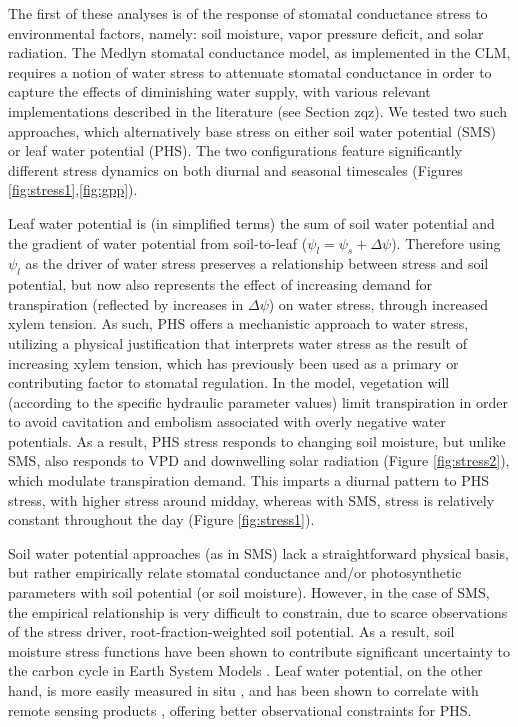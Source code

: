 \documentclass[draft,linenumbers]{agujournal}
\begin{document}
    The first of these analyses is of the response of stomatal conductance stress to environmental factors, namely: soil moisture, vapor pressure deficit, and solar radiation.
    The Medlyn stomatal conductance model, as implemented in the CLM, requires a notion of water stress to attenuate stomatal conductance in order to capture the effects of diminishing water supply,
    with various relevant implementations described in the literature (see Section zqz).
    We tested two such approaches, which alternatively base stress on either soil water potential (SMS) or leaf water potential (PHS).
    The two configurations feature significantly different stress dynamics on both diurnal and seasonal timescales (Figures \ref{fig:stress1},\ref{fig:gpp}).     
        
    Leaf water potential is (in simplified terms) the sum of soil water potential and the gradient of water potential from soil-to-leaf ($\psi_l=\psi_s+\Delta\psi$).
    Therefore using $\psi_l$ as the driver of water stress preserves a relationship between stress and soil potential, but now also represents the effect of increasing demand for transpiration (reflected by increases in $\Delta\psi$) on water stress, through increased xylem tension.
    As such, PHS offers a mechanistic approach to water stress, utilizing a physical justification that interprets water stress as the result of increasing xylem tension, which has previously been used as a primary \citep{sperry2017} or contributing \citep{novick2016a} factor to stomatal regulation.
    In the model, vegetation will (according to the specific hydraulic parameter values) limit transpiration in order to avoid cavitation and embolism associated with overly negative water potentials.
    As a result, PHS stress responds to changing soil moisture, but unlike SMS, also responds to VPD and downwelling solar radiation (Figure \ref{fig:stress2}), which modulate transpiration demand.
    This imparts a diurnal pattern to PHS stress, with higher stress around midday, whereas with SMS, stress is relatively constant throughout the day (Figure \ref{fig:stress1}).
   
    Soil water potential approaches (as in SMS) lack a straightforward physical basis, but rather empirically relate stomatal conductance and/or photosynthetic parameters with soil potential (or soil moisture).
    However, in the case of SMS, the empirical relationship is very difficult to constrain, due to scarce observations of the stress driver, root-fraction-weighted soil potential.
    As a result, soil moisture stress functions have been shown to contribute significant uncertainty to the carbon cycle in Earth System Models \citep{trugman2018}.
    Leaf water potential, on the other hand, is more easily measured in situ \citep{boyer1967}, and has been shown to correlate with remote sensing products \citep{momen2017}, offering better observational constraints for PHS.
\end{document}
